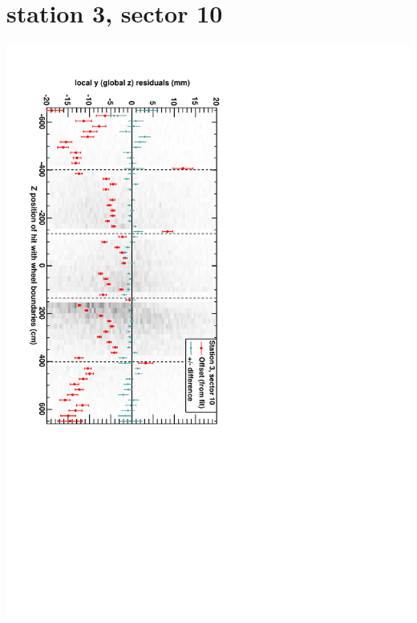 \documentclass[compress]{beamer}
\begin{document}
\section*{station 3, sector 10}
\begin{frame} \vfill \mbox{\hspace{-1 cm}\includegraphics[height=1.2\linewidth, angle=90]{DTzVsZ_st3_sr10.pdf}} \end{frame}
\end{document}
